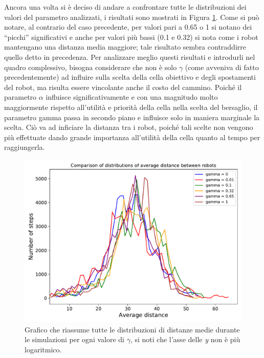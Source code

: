 Ancora una volta si è deciso di andare a confrontare tutte le distribuzioni dei valori del parametro analizzati, i risultati sono mostrati in Figura \ref{fig:gammaHComparison}.
Come si può notare, al contrario del caso precedente, per valori pari a 0.65 o 1 si notano dei “picchi” significativi e anche per valori più bassi (0.1 e 0.32) si nota come i robot mantengano una distanza media maggiore; tale risultato sembra contraddirre quello detto in precedenza.
Per analizzare meglio questi risultati e introdurli nel quadro complessivo, bisogna considerare che non è solo $\gamma$ (come avveniva di fatto precedentemente) ad influire sulla scelta della cella obiettivo e degli spostamenti del robot, ma risulta essere vincolante anche il costo del cammino. 
Poiché il parametro $\alpha$ influisce significativamente e con una magnitudo molto maggiormente rispetto all'utilità e priorità della cella nella scelta del bersaglio, il parametro gamma passa in secondo piano e influisce solo in maniera marginale la scelta. Ciò va ad inficiare la distanza tra i robot, poiché tali scelte non vengono più effettuate dando grande importanza all'utilità della cella quanto al tempo per raggiungerla.
\begin{figure}
	\centering
	\includegraphics[width=0.9\linewidth]{images/gamma_results/high_alpha/comparison}
	\caption{Grafico che riassume tutte le distribuzioni di distanze medie durante le simulazioni per ogni valore di $\gamma$, si noti che l'asse delle \textit{y} non è più logaritmico.}
	\label{fig:gammaHComparison}
\end{figure}
